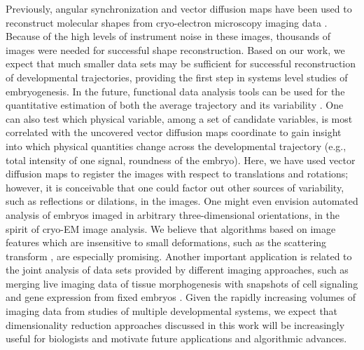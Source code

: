 \documentclass{pnastwo}
\begin{document}
\begin{article}
Previously, angular synchronization and vector diffusion maps have been used to reconstruct molecular shapes from cryo-electron microscopy imaging data \cite{singer2012vector, singer2011three}. 
%
Because of the high levels of instrument noise in these images, thousands of images were needed for successful shape reconstruction. 
%
Based on our work, we expect that much smaller data sets may be sufficient for successful reconstruction of developmental trajectories, providing the first step in systems level studies of embryogenesis. 
%
In the future, functional data analysis tools can be used for the quantitative estimation of both the average trajectory and its variability \cite{silverman2005functional}.  
%
One can also test which physical variable, among a set of candidate variables, is most correlated with the uncovered vector diffusion maps coordinate to gain insight into which physical quantities change across the developmental trajectory (e.g., total intensity of one signal, roundness of the embryo).
%
Here, we have used vector diffusion maps to register the images with respect to translations and rotations; however, it is conceivable that one could factor out other sources of variability, such as reflections \cite{singer2012vector, goemans1995improved} or dilations, in the images.
%
One might even envision automated analysis of embryos imaged in arbitrary three-dimensional orientations, in the spirit of cryo-EM image analysis.
%
We believe that algorithms based on image features which are insensitive to small deformations, such as the scattering transform \cite{mallat2012group}, are especially promising.
%
Another important application is related to the joint analysis of data sets provided by different imaging approaches, such as merging live imaging data of tissue morphogenesis with snapshots of cell signaling and gene expression from fixed embryos \cite{krzic2012multiview, ichikawa2014live, rubel2010coupling}. 
%
Given the rapidly increasing volumes of imaging data from studies of multiple developmental systems, we expect that dimensionality reduction approaches discussed in this work will be increasingly useful for biologists and motivate future applications and algorithmic advances. 
  






\end{article}
\end{document}
